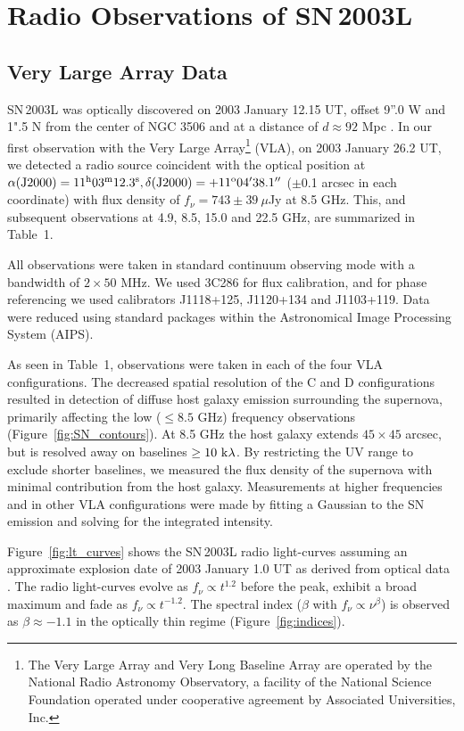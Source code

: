 \documentclass[12pt,preprint]{aastex}
\begin{document}
\section{Radio Observations of SN\,2003L}
\label{sec:obs}
\subsection{Very Large Array Data}

SN\,2003L was optically discovered on 2003 January 12.15 UT, offset 9''.0 W
and 1".5 N from the center of NGC 3506 \citep{b03} and at a distance of
$d\approx 92$ Mpc \citep{vcd+03}.  In our first observation with the
Very Large Array\footnote{The Very Large Array and Very Long Baseline
Array are operated by the National Radio Astronomy Observatory, a
facility of the National Science Foundation operated under cooperative
agreement by Associated Universities, Inc.} (VLA), on 2003 January
26.2 UT, we detected a radio source coincident with the optical
position at $\alpha\rm (J2000)=11^{\rm h}03^{\rm m}12.3^{\rm s},
\delta\rm (J2000)=+11^{\rm o}04'38.1''$ ($\pm$0.1 arcsec in each
coordinate) with flux density of $f_{\nu}=743\pm 39~\mu$Jy at 8.5 GHz.
This, and subsequent observations at 4.9, 8.5, 15.0 and 22.5 GHz, are
summarized in Table~1.

All observations were taken in standard continuum observing mode with
a bandwidth of $2\times 50$ MHz.  We used 3C286 for flux calibration,
and for phase referencing we used calibrators J1118+125, J1120+134 and
J1103+119.  Data were reduced using standard packages within the
Astronomical Image Processing System (AIPS).

As seen in Table~1, observations were taken in each of the
four VLA configurations.  The decreased spatial resolution of the C
and D configurations resulted in detection of diffuse host galaxy
emission surrounding the supernova, primarily affecting the low ($\le
8.5$ GHz) frequency observations (Figure~\ref{fig:SN_contours}).  At
8.5 GHz the host galaxy extends $45\times 45$ arcsec, but is resolved
away on baselines $\geq 10~\rm k\lambda$.  By restricting the UV range
to exclude shorter baselines, we measured the flux density of the
supernova with minimal contribution from the host galaxy.
Measurements at higher frequencies and in other VLA configurations were
made by fitting a Gaussian to the SN emission and solving for
the integrated intensity.

Figure~\ref{fig:lt_curves} shows the SN\,2003L radio light-curves
assuming an approximate explosion date of 2003 January 1.0 UT as
derived from optical data \citep{skg+04}.  The radio light-curves evolve
as $f_{\nu}\propto t^{1.2}$ before the peak, exhibit a broad maximum
and fade as $f_{\nu}\propto t^{-1.2}$.  The spectral index ($\beta$
with $f_{\nu}\propto \nu^{\beta}$) is observed as $\beta \approx -1.1$
in the optically thin regime (Figure~\ref{fig:indices}).
\end{document}
